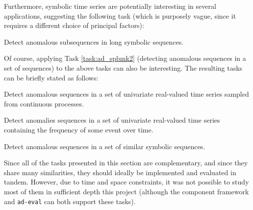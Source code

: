 Furthermore, symbolic time series are potentially interesting in several applications, suggesting the following task (which is purposely vague, since it requires a different choice of principal factors): 

\begin{task}
  Detect anomalous subsequences in long symbolic sequences.
\end{task}

Of course, applying Task \ref{task:ad_splunk2} (detecting anomalous sequences in a set of sequences) to the above tasks can also be interesting. The resulting tasks can be briefly stated as follows:

\begin{task}
  Detect anomalous sequences in a set of univariate real-valued time series sampled from continuous processes.
\end{task}

\begin{task}
  Detect anomalies sequences in a set of univariate real-valued time series containing the frequency of some event over time.
\end{task}

\begin{task}
  Detect anomalous sequences in a set of similar symbolic sequences.
\end{task}

Since all of the tasks presented in this section are complementary, and since they share many similarities, they should ideally be implemented and evaluated in tandem. However, due to time and space constraints, it was not possible to study most of them in sufficient depth this project (although the component framework and \texttt{ad-eval} can both support these tasks).
